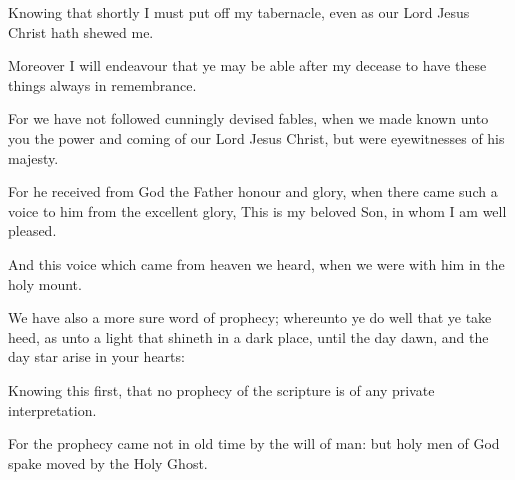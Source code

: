 {Knowing
that
shortly I must put
off
{}
my
tabernacle,
even
as
our
Lord
Jesus
Christ hath
shewed
me.

Moreover I will endeavour
that
ye may be
able
after
my
decease to
have these
things
always in
remembrance.

For we
have
not
followed cunningly
devised
fables, when we made
known unto
you the
power
and
coming
of
our
Lord
Jesus
Christ,
but
were
eyewitnesses
of
his
majesty.

For he
received
from
God the
Father
honour
and
glory, when there
came
such a
voice to
him
from
the
excellent
glory,
This
is
my
beloved
Son,
in
whom
I am well
pleased.

And
this
voice which
came
from
heaven
we
heard, when we
were
with
him
in
the
holy
mount.

We
have
also
a more
sure
word of
prophecy;
whereunto ye
do
well that ye take
heed, as
unto a
light that
shineth
in
a
dark
place,
until the
day
dawn,
and the day
star
arise
in
your
hearts:

Knowing
this
first,
that
no
prophecy of the
scripture
is
of
any
private
interpretation.

For the
prophecy
came
not in old
time by the
will of
man:
but
holy
men
of
God
spake
{}
moved by
the
Holy
Ghost.




\par }

